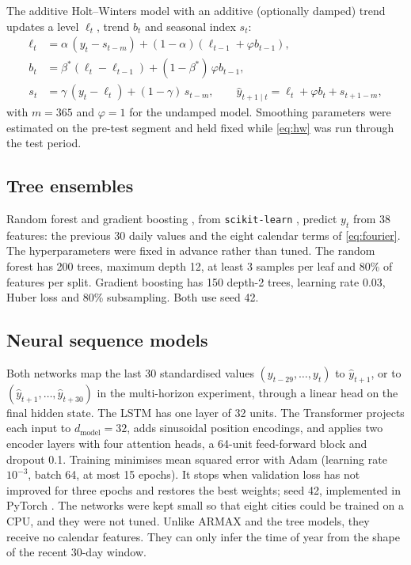 \documentclass[11pt,a4paper]{article}
\newcommand{\code}[1]{\texttt{#1}}
\begin{document}
The additive Holt--Winters model with an additive (optionally damped) trend \citep{holt2004forecasting,winters1960forecasting,gardner1985forecasting} updates a level $\ell_t$, trend $b_t$ and seasonal index $s_t$:
\begin{align}
  \ell_t &= \alpha\,(y_t - s_{t-m}) + (1-\alpha)(\ell_{t-1} + \varphi b_{t-1}), \nonumber\\
  b_t &= \beta^{*}(\ell_t - \ell_{t-1}) + (1-\beta^{*})\,\varphi b_{t-1}, \label{eq:hw}\\
  s_t &= \gamma\,(y_t - \ell_t) + (1-\gamma)\,s_{t-m}, \qquad
  \hat y_{t+1\mid t} = \ell_t + \varphi b_t + s_{t+1-m}, \nonumber
\end{align}
with $m = 365$ and $\varphi = 1$ for the undamped model. Smoothing parameters were estimated on the pre-test segment and held fixed while \cref{eq:hw} was run through the test period.

\subsection{Tree ensembles}

Random forest \citep{breiman2001random} and gradient boosting \citep{friedman2001greedy}, from \code{scikit-learn} \citep{pedregosa2011scikit}, predict $y_t$ from 38 features: the previous 30 daily values and the eight calendar terms of \cref{eq:fourier}. The hyperparameters were fixed in advance rather than tuned. The random forest has 200 trees, maximum depth 12, at least 3 samples per leaf and 80\% of features per split. Gradient boosting has 150 depth-2 trees, learning rate 0.03, Huber loss and 80\% subsampling. Both use seed 42.

\subsection{Neural sequence models}

Both networks map the last 30 standardised values $(y_{t-29},\dots,y_t)$ to $\hat y_{t+1}$, or to $(\hat y_{t+1},\dots,\hat y_{t+30})$ in the multi-horizon experiment, through a linear head on the final hidden state. The LSTM \citep{hochreiter1997long} has one layer of 32 units. The Transformer \citep{vaswani2017attention} projects each input to $d_{\text{model}} = 32$, adds sinusoidal position encodings, and applies two encoder layers with four attention heads, a 64-unit feed-forward block and dropout 0.1. Training minimises mean squared error with Adam \citep{kingma2015adam} (learning rate $10^{-3}$, batch 64, at most 15 epochs). It stops when validation loss has not improved for three epochs and restores the best weights; seed 42, implemented in PyTorch \citep{paszke2019pytorch}. The networks were kept small so that eight cities could be trained on a CPU, and they were not tuned. Unlike ARMAX and the tree models, they receive no calendar features. They can only infer the time of year from the shape of the recent 30-day window.
\end{document}
